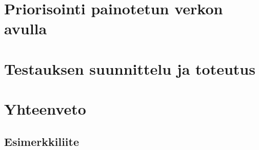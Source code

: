 \documentclass[finnish, authoryear]{config/tauthesis}
\theoremstyle{definition}
\begin{document}
\chapter{Priorisointi painotetun verkon avulla}
\label{ch:testitapauksien_priorisointi}

\chapter{Testauksen suunnittelu ja toteutus}
\label{ch:testauksen_suunnittelu_ja_toteutus}

\chapter{Yhteenveto}
\label{ch:yhteenveto}

\printbibliography[heading=bibintoc]

\begin{appendices}
\chapter{Esimerkkiliite}
\label{ch:liite}

\end{appendices}
\end{document}
